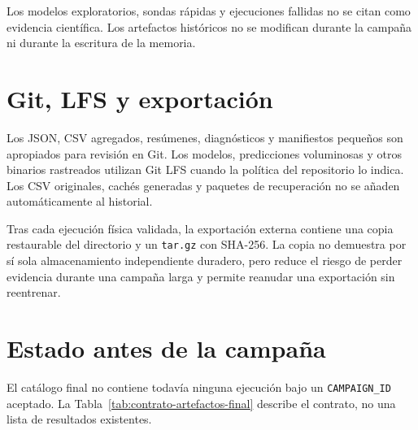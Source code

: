 Los modelos exploratorios, sondas rápidas y ejecuciones fallidas no se citan como evidencia científica. Los artefactos históricos no se modifican durante la campaña ni durante la escritura de la memoria.

\section{Git, LFS y exportación}

Los JSON, CSV agregados, resúmenes, diagnósticos y manifiestos pequeños son apropiados para revisión en Git. Los modelos, predicciones voluminosas y otros binarios rastreados utilizan Git LFS cuando la política del repositorio lo indica. Los CSV originales, cachés generadas y paquetes de recuperación no se añaden automáticamente al historial.

Tras cada ejecución física validada, la exportación externa contiene una copia restaurable del directorio y un \texttt{tar.gz} con SHA-256. La copia no demuestra por sí sola almacenamiento independiente duradero, pero reduce el riesgo de perder evidencia durante una campaña larga y permite reanudar una exportación sin reentrenar.

\section{Estado antes de la campaña}

El catálogo final no contiene todavía ninguna ejecución bajo un \texttt{CAMPAIGN\_ID} aceptado. La Tabla~\ref{tab:contrato-artefactos-final} describe el contrato, no una lista de resultados existentes.

